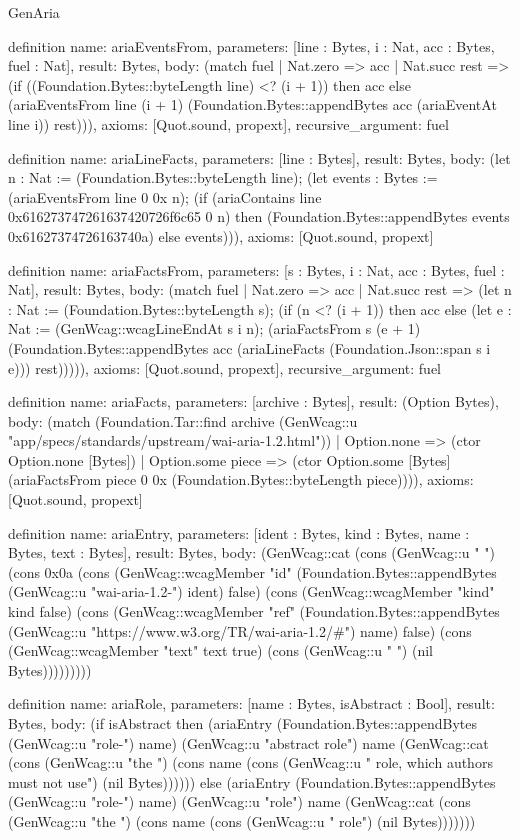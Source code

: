 \begin{lexlean}{GenAria}
\begin{semanticmodule}
definition{
  name: ariaEventsFrom,
  parameters: [line : Bytes, i : Nat, acc : Bytes, fuel : Nat],
  result: Bytes,
  body: (match fuel
    | Nat.zero => acc
    | Nat.succ rest => (if ((Foundation.Bytes::byteLength line) <? (i + 1)) then acc else (ariaEventsFrom line (i + 1) (Foundation.Bytes::appendBytes acc (ariaEventAt line i)) rest))),
  axioms: [Quot.sound, propext],
  recursive_argument: fuel
}

definition{
  name: ariaLineFacts,
  parameters: [line : Bytes],
  result: Bytes,
  body: (let n : Nat := (Foundation.Bytes::byteLength line); (let events : Bytes := (ariaEventsFrom line 0 0x n); (if (ariaContains line 0x616273747261637420726f6c65 0 n) then (Foundation.Bytes::appendBytes events 0x61627374726163740a) else events))),
  axioms: [Quot.sound, propext]
}

definition{
  name: ariaFactsFrom,
  parameters: [s : Bytes, i : Nat, acc : Bytes, fuel : Nat],
  result: Bytes,
  body: (match fuel
    | Nat.zero => acc
    | Nat.succ rest => (let n : Nat := (Foundation.Bytes::byteLength s); (if (n <? (i + 1)) then acc else (let e : Nat := (GenWcag::wcagLineEndAt s i n); (ariaFactsFrom s (e + 1) (Foundation.Bytes::appendBytes acc (ariaLineFacts (Foundation.Json::span s i e))) rest))))),
  axioms: [Quot.sound, propext],
  recursive_argument: fuel
}

definition{
  name: ariaFacts,
  parameters: [archive : Bytes],
  result: (Option Bytes),
  body: (match (Foundation.Tar::find archive (GenWcag::u "app/specs/standards/upstream/wai-aria-1.2.html"))
    | Option.none => (ctor Option.none [Bytes])
    | Option.some piece => (ctor Option.some [Bytes] (ariaFactsFrom piece 0 0x (Foundation.Bytes::byteLength piece)))),
  axioms: [Quot.sound, propext]
}

definition{
  name: ariaEntry,
  parameters: [ident : Bytes, kind : Bytes, name : Bytes, text : Bytes],
  result: Bytes,
  body: (GenWcag::cat (cons (GenWcag::u " {") (cons 0x0a (cons (GenWcag::wcagMember "id" (Foundation.Bytes::appendBytes (GenWcag::u "wai-aria-1.2-") ident) false) (cons (GenWcag::wcagMember "kind" kind false) (cons (GenWcag::wcagMember "ref" (Foundation.Bytes::appendBytes (GenWcag::u "https://www.w3.org/TR/wai-aria-1.2/#") name) false) (cons (GenWcag::wcagMember "text" text true) (cons (GenWcag::u " }") (nil Bytes)))))))))
}

definition{
  name: ariaRole,
  parameters: [name : Bytes, isAbstract : Bool],
  result: Bytes,
  body: (if isAbstract then (ariaEntry (Foundation.Bytes::appendBytes (GenWcag::u "role-") name) (GenWcag::u "abstract role") name (GenWcag::cat (cons (GenWcag::u "the ") (cons name (cons (GenWcag::u " role, which authors must not use") (nil Bytes)))))) else (ariaEntry (Foundation.Bytes::appendBytes (GenWcag::u "role-") name) (GenWcag::u "role") name (GenWcag::cat (cons (GenWcag::u "the ") (cons name (cons (GenWcag::u " role") (nil Bytes)))))))
}


\end{semanticmodule}
\end{lexlean}
